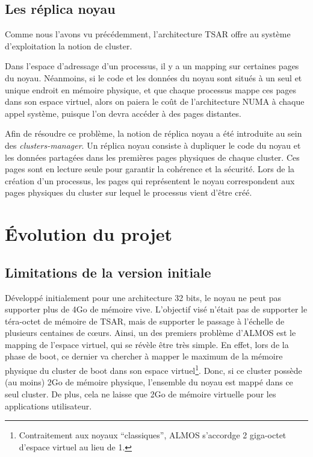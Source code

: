      
    \subsection{Les réplica noyau}

      Comme nous l'avons vu précédemment, l'architecture TSAR offre au système
      d'exploitation la notion de cluster.
      
      Dans l'espace d'adressage d'un processus, il y a un mapping sur certaines
      pages du noyau. Néanmoins, si le code et les données du noyau sont situés
      à un seul et unique endroit en mémoire physique, et que chaque processus
      mappe ces pages dans son espace virtuel, alors on paiera le coût de
      l'architecture NUMA à chaque appel système, puisque l'on devra accéder à
      des pages distantes.

      Afin de résoudre ce problème, la notion de réplica noyau a été introduite
      au sein des \textit{clusters-manager}. Un réplica noyau consiste à
      dupliquer le code du noyau et les données partagées dans les premières
      pages physiques de chaque cluster. Ces pages sont en lecture seule pour
      garantir la cohérence et la sécurité. Lors de la création d'un processus,
      les pages qui représentent le noyau correspondent aux pages physiques du
      cluster sur lequel le processus vient d'être créé.


  \section{Évolution du projet}

    \subsection{Limitations de la version initiale}
    
      Développé initialement pour une architecture 32 bits, le noyau ne peut pas
      supporter plus de 4Go de mémoire vive. L'objectif visé n'était pas de
      supporter le téra-octet de mémoire de TSAR, mais de supporter le passage à
      l'échelle de plusieurs centaines de c\oe urs. Ainsi, un des premiers
      problème d'ALMOS est le mapping de l'espace virtuel, qui se révèle être
      très simple. En effet, lors de la phase de boot, ce dernier va chercher à
      mapper le maximum de la mémoire physique du cluster de boot dans son
      espace virtuel\footnote{Contraitement aux noyaux ``classiques'', ALMOS
        s'accordge 2 giga-octet d'espace virtuel au lieu de 1.}. Donc, si ce
      cluster possède (au moins) 2Go de mémoire physique, l'ensemble du noyau
      est mappé dans ce seul cluster. De plus, cela ne laisse que 2Go de mémoire
      virtuelle pour les applications utilisateur.

